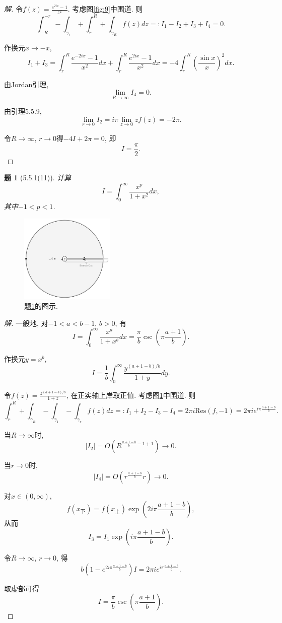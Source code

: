 \documentclass{article}[a4paper, 12pt]
\theoremstyle{mystyle}
\newtheorem{problem}{题}
\newenvironment{solution}{\begin{proof}[解]}{\end{proof}}
\begin{document}
\begin{solution}
  令\(f(z)=\frac{e^{2iz}-1}{z^2}\). 考虑图\ref{fig:9}中围道. 则\[\int_{-R}^{-r}-\int_{\gamma_r}+\int_{r}^R+\int_{\gamma_R} f(z)dz=:I_1-I_2+I_3+I_4=0.\]

  作换元\(x\to -x\), \[I_1+I_3=\int_r^R \frac{e^{-2ix}-1}{x^2}dx+\int_r^R \frac{e^{2ix}-1}{x^2}dx=-4\int_r^R \left(\frac{\sin x}{x}\right)^2dx.\]

  由Jordan引理, \[\lim_{R\to\infty} I_4=0.\]

  由引理5.5.9, \[\lim_{r\to0}I_2=i\pi\lim_{z\to0}zf(z)=-2\pi.\]

  令\(R\to\infty\), \(r\to0\)得\(-4I+2\pi=0\), 即\[I=\frac{\pi}{2}.\tag*{\(\qed\)}\]
  \renewcommand{\qedsymbol}{}
\end{solution}

\begin{problem}[5.5.1(11)] \label{11}
  计算\[I=\int_0^\infty \frac{x^p}{1+x^2}dx,\] 其中\(-1<p<1\).
\end{problem}

\begin{figure}[htbp]
  \centering
  \includegraphics[width=0.4\textwidth]{images/11.png}
  \caption{题\ref{11}的图示.}
  \label{fig:11}
\end{figure}

\begin{solution}
  一般地, 对\(-1<a<b-1\), \(b>0\), 有\[I=\int_0^\infty \frac{x^a}{1+x^b}dx=\frac{\pi}{b}\csc\left(\pi\frac{a+1}{b}\right).\]

  作换元\(y=x^b\), \[I=\frac{1}{b}\int_0^\infty\frac{y^{(a+1-b)/b}}{1+y}dy.\]

  令\(f(z)=\frac{z^{(a+1-b)/b}}{1+z}\), 在正实轴上岸取正值. 考虑图\ref{fig:11}中围道. 则\[\int_{r}^{R}+\int_{\gamma_R}-\int_{\gamma_1}-\int_{\gamma_r} f(z)dz=:I_1+I_2-I_3-I_4=2\pi i\text{Res}(f,-1)=2\pi i e^{i\pi \frac{a+1-b}{b}}.\]

  当\(R\to\infty\)时, \[|I_2|=O\left(R^{\frac{a+1-b}{b}-1+1}\right)\to0.\]

  当\(r\to0\)时, \[|I_4|=O\left(r^{\frac{a+1-b}{b}}r\right)\to0.\]

  对\(x\in(0,\infty)\), \[f(x_{\text{下}})=f(x_{\text{上}})\exp\left(2i\pi\frac{a+1-b}{b}\right),\] 从而\[I_3=I_1\exp\left(i\pi\frac{a+1-b}{b}\right).\]

  令\(R\to\infty\), \(r\to 0\), 得\[b\left(1-e^{2i\pi \frac{a+1-b}{b}}\right)I=2\pi i e^{i\pi \frac{a+1-b}{b}}.\]

  取虚部可得\[I=\frac{\pi}{b}\csc\left(\pi\frac{a+1}{b}\right). \tag*{\(\qed\)}\]
  \renewcommand{\qedsymbol}{}
\end{solution}
\end{document}
